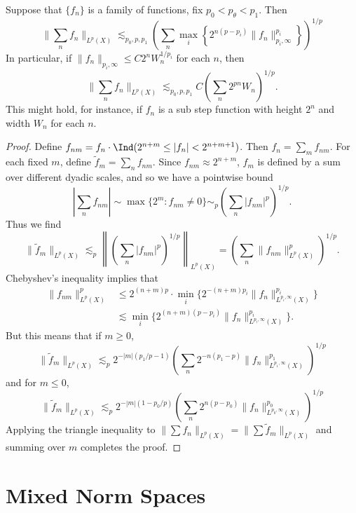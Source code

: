 \begin{theorem}
  Suppose that $\{ f_n \}$ is a family of functions, fix $p_0 < p_\theta < p_1$. Then
  \[ \| \sum_n f_n \|_{L^p(X)} \lesssim_{p_0,p,p_1} \left( \sum_n \max_i \left\{ 2^{n(p - p_i)} \| f_n \|_{p_i,\infty}^{p_i} \right\} \right)^{1/p} \]
  In particular, if $\| f_n \|_{p_i,\infty} \leq C 2^n W_n^{1/p_i}$ for each $n$, then
  \[ \| \sum_n f_n \|_{L^p(X)} \lesssim_{p_0,p,p_1} C \left( \sum_n 2^{pn} W_n \right)^{1/p}. \]
  This might hold, for instance, if $f_n$ is a sub step function with height $2^n$ and width $W_n$ for each $n$.
\end{theorem}
\begin{proof}
  Define $f_{nm} = f_n \cdot \Ind(2^{n+m} \leq |f_n| < 2^{n+m+1})$. Then $f_n = \sum_m f_{nm}$. For each fixed $m$, define $\tilde{f}_m = \sum_n f_{nm}$. Since $f_{nm} \approx 2^{n+m}$, $f_m$ is defined by a sum over different dyadic scales, and so we have a pointwise bound
  \[ |\sum_n f_{nm}| \sim \max \{ 2^m : f_{nm} \neq 0 \} \sim_p \left( \sum_n |f_{nm}|^p \right)^{1/p}. \]
  Thus we find
  \[ \| \tilde{f}_m \|_{L^p(X)} \lesssim_p \left\| \left( \sum_n |f_{nm}|^p \right)^{1/p} \right\|_{L^p(X)} = \left( \sum_n \| f_{nm} \|_{L^p(X)}^p \right)^{1/p}. \]
  Chebyshev's inequality implies that
  \begin{align*}
    \| f_{nm} \|_{L^p(X)}^p &\leq 2^{(n+m)p} \cdot \min_i \{ 2^{-(n+m) p_i} \| f_n \|_{L^{p_i,\infty}(X)}^{p_i} \}\\
    &\lesssim \min_i \{ 2^{(n+m)(p - p_i)} \| f_n \|_{L^{p_i,\infty}(X)}^{p_i} \}.
  \end{align*}
  But this means that if $m \geq 0$,
  \[ \| \tilde{f}_m \|_{L^p(X)} \lesssim_p 2^{-|m|(p_1/p - 1)} \left( \sum_n 2^{-n(p_1 - p)} \| f_n \|_{L^{p_1,\infty}(X)}^{p_1} \right)^{1/p} \]
  and for $m \leq 0$,
  \[ \| \tilde{f}_m \|_{L^p(X)} \lesssim_p 2^{-|m|(1 - p_0/p)} \left( \sum_n 2^{n(p - p_0)} \| f_n \|_{L^{p_0,\infty}(X)}^{p_0} \right)^{1/p} \]
  Applying the triangle inequality to $\| \sum f_n \|_{L^p(X)} = \| \sum \tilde{f}_m \|_{L^p(X)}$ and summing over $m$ completes the proof.
\end{proof}

\section{Mixed Norm Spaces}

